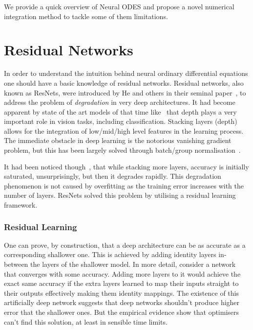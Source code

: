\documentclass[11pt]{report}
\begin{document}
    We provide a quick overview of Neural ODES and propose a novel numerical integration method to tackle some of
    them limitations.


    \chapter{Residual Networks} \label{ch:resnet}
    In order to understand the intuition behind neural ordinary differential equations one should have a basic knowledge
    of residual networks.
    Residual networks, also known as ResNets, were introduced by He and others in their seminal
    paper~\cite{He_2016_CVPR}, to address the problem of \textit{degradation} in very deep architectures.
    It had become apparent by state of the art models of that time like~\cite{simonyan2014very} that depth plays a very
    important role in vision tasks, including classification.
    Stacking layers (depth) allows for the integration of low/mid/high level features in the learning process.
    The immediate obstacle in deep learning is the notorious vanishing gradient problem, but this has been largely
    solved through batch/group normalisation~\cite{ioffe2015batch}.

    It had been noticed though~\cite{srivastava2015highway}, that while stacking more layers, accuracy is initially saturated, unsurprisingly, but then it degrades rapidly.
    This degradation phenomenon is not caused by overfitting as the training error increases with the number of layers.
    ResNets solved this problem by utilising a residual learning framework.

    \subsection{Residual Learning}
    One can prove, by construction, that a deep architecture can be as accurate as a corresponding shallower one.
    This is achieved by adding identity layers in-between the layers of the shallower model.
    In more detail, consider a network that converges with some accuracy.
    Adding more layers to it would achieve the exact same accuracy if the extra layers learned to map their inputs straight to their outputs effectively making them identity mappings.
    The existence of this artificially deep network suggests that deep networks shouldn't produce higher error that the shallower ones.
    But the empirical evidence show that optimisers can't find this solution, at least in sensible time limits.
\end{document}
